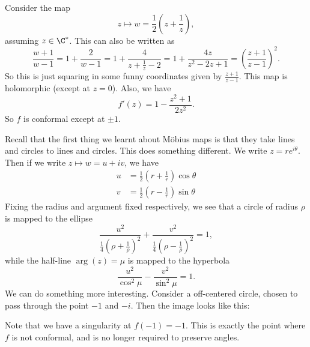 \documentclass[a4paper]{article}
\begin{document}
\begin{eg}
  Consider the map
  \[
    z \mapsto w = \frac{1}{2}\left(z + \frac{1}{z}\right),
  \]
  assuming $z \in \C^*$. This can also be written as
  \[
    \frac{w + 1}{w - 1} = 1 + \frac{2}{w - 1} = 1 + \frac{4}{z + \frac{1}{z} - 2} = 1 + \frac{4z}{z^2 - 2z + 1} = \left(\frac{z + 1}{z - 1}\right)^2.
  \]
  So this is just squaring in some funny coordinates given by $\frac{z + 1}{z - 1}$. This map is holomorphic (except at $z = 0$). Also, we have
  \[
    f'(z) = 1 - \frac{z^2 + 1}{2z^2}.
  \]
  So $f$ is conformal except at $\pm 1$.

  Recall that the first thing we learnt about M\"obius maps is that they take lines and circles to lines and circles. This does something different. We write $z = re^{i\theta}$. Then if we write $z \mapsto w = u + iv$, we have
  \begin{align*}
    u &= \frac{1}{2}\left(r + \frac{1}{r}\right) \cos \theta\\
    v &= \frac{1}{2}\left(r - \frac{1}{r}\right) \sin \theta
  \end{align*}
  Fixing the radius and argument fixed respectively, we see that a circle of radius $\rho$ is mapped to the ellipse
  \[
    \frac{u^2}{\frac{1}{4}\left(\rho + \frac{1}{\rho}\right)^2} + \frac{v^2}{\frac{1}{4}\left(\rho - \frac{1}{\rho}\right)^2} = 1,
  \]
  while the half-line $\arg(z) = \mu$ is mapped to the hyperbola
  \[
    \frac{u^2}{\cos^2\mu} - \frac{v^2}{\sin^2 \mu} = 1.
  \]
  We can do something more interesting. Consider a off-centered circle, chosen to pass through the point $-1$ and $-i$. Then the image looks like this:
  \begin{center}
  \end{center}
  Note that we have a singularity at $f(-1) = -1$. This is exactly the point where $f$ is not conformal, and is no longer required to preserve angles.


\end{eg}
\end{document}
